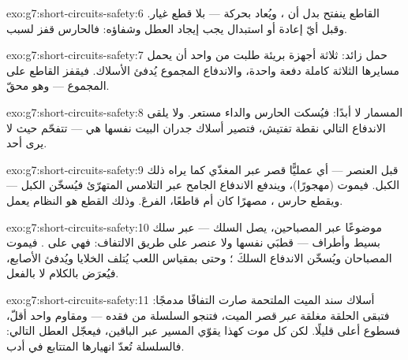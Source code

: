\begin{solution}{exo:g7:short-circuits-safety:6}
القاطع ينفتح بدل أن ، ويُعاد بحركة --- بلا قطع غيار. وقبل
أيّ إعادة أو استبدال يجب إيجاد العطل وشفاؤه: فالحارس قفز
لسبب.
\end{solution}

\begin{solution}{exo:g7:short-circuits-safety:7}
حمل زائد: ثلاثة أجهزة بريئة طلبت من  واحد أن يحمل مسايرها
الثلاثة كاملة دفعة واحدة، والاندفاع المجموع يُدفئ الأسلاك.
فيقفز القاطع على المجموع --- وهو محقّ.
\end{solution}

\begin{solution}{exo:g7:short-circuits-safety:8}
المسمار لا  أبدًا: فيُسكت الحارس والداء مستعر. ولا يلقى
الاندفاع التالي نقطة تفتيش، فتصير أسلاك جدران البيت نفسها هي
 --- تتفحّم حيث لا يرى أحد.
\end{solution}

\begin{solution}{exo:g7:short-circuits-safety:9}
 قبل العنصر --- أي عمليًّا قصر عبر المغذّي كما يراه
ذلك الكبل. فيموت  (مهجورًا)، ويندفع الاندفاع الجامح عبر
التلامس المتهرّئ فيُسخّن الكبل --- ويقطع حارس ، مصهرًا كان
أم قاطعًا، الفرعَ. وذلك القطع هو النظام يعمل.
\end{solution}

\begin{solution}{exo:g7:short-circuits-safety:10}
موضوعًا عبر المصباحين، يصل السلك --- عبر سلك بسيط وأطراف
 --- قطبَي  نفسها ولا عنصر على طريق الالتفاف:
فهي  على . فيموت المصباحان ويُسخّن الاندفاع
السلكَ ؛ وحتى بمقياس اللعب يُتلف الخلايا ويُدفئ
الأصابع، فيُعرَض بالكلام لا بالفعل.
\end{solution}

\begin{solution}{exo:g7:short-circuits-safety:11}
أسلاك سند  الميت الملتحمة صارت التفافًا مدمجًا: فتبقى
الحلقة مغلقة \emph{عبر} قصر  الميت، فتنجو السلسلة من
فقده --- ومقاوم واحد أقلّ، فسطوع أعلى قليلًا. لكن كل موت كهذا
يقوّي المسير عبر الباقين، فيعجّل العطل التالي: فالسلسلة تُعدّ
انهيارها المتتابع في أدب.
\end{solution}

